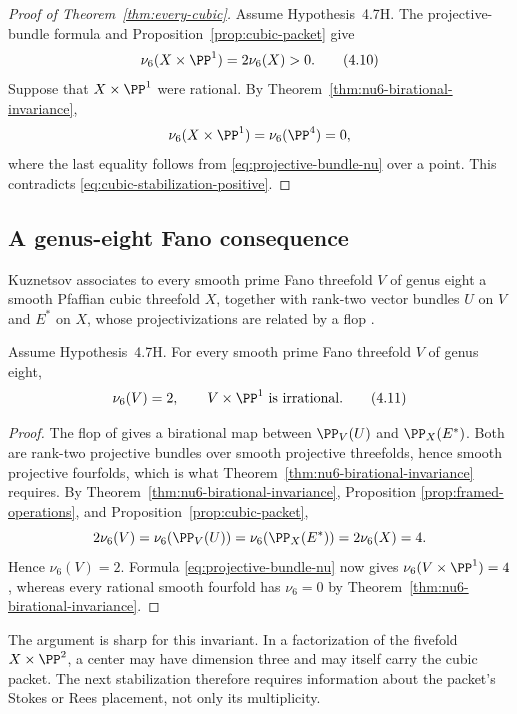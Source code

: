 \begin{proof}[Proof of Theorem~\ref{thm:every-cubic}]
Assume Hypothesis~4.7H.
The projective-bundle formula and Proposition~\ref{prop:cubic-packet} give
\[
 \nu_6(X\times\PP^1)=2\nu_6(X)>0.
 \tag{4.10}
 \label{eq:cubic-stabilization-positive}
\]
Suppose that \(X\times\PP^1\) were rational.  By
Theorem~\ref{thm:nu6-birational-invariance},
\[
 \nu_6(X\times\PP^1)=\nu_6(\PP^4)=0,
\]
where the last equality follows from \eqref{eq:projective-bundle-nu} over a
point.  This contradicts \eqref{eq:cubic-stabilization-positive}.
\end{proof}

\subsection{A genus-eight Fano consequence}

Kuznetsov associates to every smooth prime Fano threefold \(V\) of genus
eight a smooth Pfaffian cubic threefold \(X\), together with rank-two vector
bundles \(U\) on \(V\) and \(E^*\) on \(X\), whose projectivizations are
related by a flop \cite[Theorems~2.17--2.18]{KuznetsovV14}.

\begin{corollary}
\label{cor:v14-one-step}
Assume Hypothesis~4.7H.
For every smooth prime Fano threefold \(V\) of genus eight,
\[
 \nu_6(V)=2,
 \qquad
 V\times\PP^1\ \text{is irrational}.
 \tag{4.11}
 \label{eq:v14-stabilization}
\]
\end{corollary}

\begin{proof}
The flop of \cite[Theorems~2.17--2.18]{KuznetsovV14} gives a birational map
between \(\PP_V(U)\) and \(\PP_X(E^*)\).  Both are rank-two projective bundles
over smooth projective threefolds, hence smooth projective fourfolds, which is
what Theorem~\ref{thm:nu6-birational-invariance} requires.  By
Theorem~\ref{thm:nu6-birational-invariance}, Proposition
\ref{prop:framed-operations}, and Proposition~\ref{prop:cubic-packet},
\[
 2\nu_6(V)=\nu_6(\PP_V(U))
 =\nu_6(\PP_X(E^*))=2\nu_6(X)=4.
\]
Hence \(\nu_6(V)=2\).  Formula \eqref{eq:projective-bundle-nu} now gives
\(\nu_6(V\times\PP^1)=4\), whereas every rational smooth fourfold has
\(\nu_6=0\) by Theorem~\ref{thm:nu6-birational-invariance}.
\end{proof}

The argument is sharp for this invariant.  In a factorization of the fivefold
\(X\times\PP^2\), a center may have dimension three and may itself carry the
cubic packet.  The next stabilization therefore requires information about
the packet's Stokes or Rees placement, not only its multiplicity.

